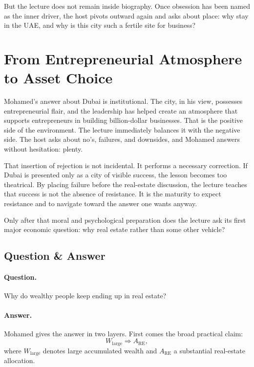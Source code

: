But the lecture does not remain inside biography. Once obsession has been named as the inner driver, the host pivots outward again and asks about place: why stay in the UAE, and why is this city such a fertile site for business?

\section{From Entrepreneurial Atmosphere to Asset Choice}

Mohamed's answer about Dubai is institutional. The city, in his view, possesses entrepreneurial flair, and the leadership has helped create an atmosphere that supports entrepreneurs in building billion-dollar businesses. That is the positive side of the environment. The lecture immediately balances it with the negative side. The host asks about no's, failures, and downsides, and Mohamed answers without hesitation: plenty.

That insertion of rejection is not incidental. It performs a necessary correction. If Dubai is presented only as a city of visible success, the lesson becomes too theatrical. By placing failure before the real-estate discussion, the lecture teaches that success is not the absence of resistance. It is the maturity to expect resistance and to navigate toward the answer one wants anyway.

Only after that moral and psychological preparation does the lecture ask its first major economic question: why real estate rather than some other vehicle?

\subsection{Question \& Answer}

\paragraph{Question.} Why do wealthy people keep ending up in real estate?

\paragraph{Answer.} Mohamed gives the answer in two layers. First comes the broad practical claim:
\begin{equation}
W_{\text{large}} \Longrightarrow A_{\text{RE}},
\end{equation}
where \(W_{\text{large}}\) denotes large accumulated wealth and \(A_{\text{RE}}\) a substantial real-estate allocation.

